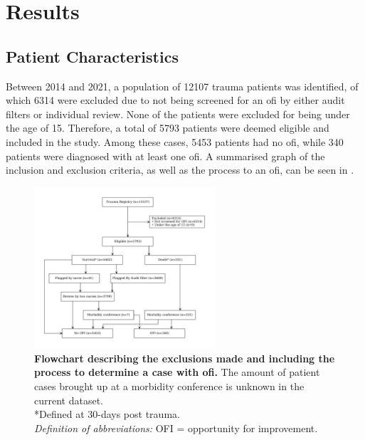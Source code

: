 \documentclass[12pt, a4paper]{article}
\begin{document}
\section{Results}
\subsection{Patient Characteristics}

Between 2014 and 2021, a population of \num{12107} trauma patients was identified, of which \num{6314} were excluded
due to not being screened for an \acrshort{ofi} by either audit filters or individual review. None of the patients were
excluded for being under the age of 15. Therefore, a total of \num{5793} patients were deemed eligible and included in
the study. Among these cases, \num{5453} patients had no \acrshort{ofi}, while \num{340} patients were diagnosed with
at least one \acrshort{ofi}. A summarised graph of the inclusion and exclusion criteria, as well as the process to an
\acrshort{ofi}, can be seen in .

\begin{figure}
	\centering
	\includegraphics[width=0.6\textwidth]{figures/flowchart.pdf}
	\caption{\textbf{Flowchart describing the exclusions made and including the process to determine a case with \acrshort{ofi}.} The amount of patient cases brought up at a morbidity conference is unknown in the current dataset.\\
		*Defined at 30-days post trauma.\\
		\textit{Definition of abbreviations:} OFI = opportunity for improvement.}%
	\label{fig:flowchart}
\end{figure}
\end{document}
